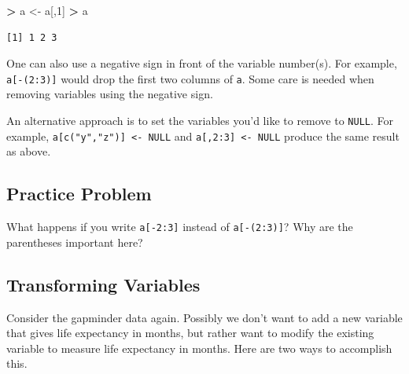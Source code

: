 \documentclass[]{krantz}
\makeatletter
\newenvironment{Shaded}{\begin{snugshade}}{\end{snugshade}}
\newcommand{\KeywordTok}[1]{\textcolor[rgb]{0.27,0.27,0.27}{\textbf{#1}}}
\newcommand{\DecValTok}[1]{\textcolor[rgb]{0.06,0.06,0.06}{#1}}
\newcommand{\StringTok}[1]{\textcolor[rgb]{0.5,0.5,0.5}{#1}}
\newcommand{\OperatorTok}[1]{\textcolor[rgb]{0.43,0.43,0.43}{\textbf{#1}}}
\newcommand{\NormalTok}[1]{#1}
\newenvironment{kframe}{%
\medskip{}
\setlength{\fboxsep}{.8em}
 \def\at@end@of@kframe{}%
 \ifinner\ifhmode%
  \def\at@end@of@kframe{\end{minipage}}%
  \begin{minipage}{\columnwidth}%
 \fi\fi%
 \def\FrameCommand##1{\hskip\@totalleftmargin \hskip-\fboxsep
 \colorbox{shadecolor}{##1}\hskip-\fboxsep
     \hskip-\linewidth \hskip-\@totalleftmargin \hskip\columnwidth}%
 \MakeFramed {\advance\hsize-\width
   \@totalleftmargin\z@ \linewidth\hsize
   \@setminipage}}%
 {\par\unskip\endMakeFramed%
 \at@end@of@kframe}
\renewenvironment{Shaded}{\begin{kframe}}{\end{kframe}}
\makeatother
\begin{document}
\begin{Shaded}
\begin{Highlighting}[]
\OperatorTok{>}\StringTok{ }\NormalTok{a <-}\StringTok{ }\NormalTok{a[,}\DecValTok{1}\NormalTok{]}
\OperatorTok{>}\StringTok{ }\NormalTok{a}
\end{Highlighting}
\end{Shaded}

\begin{verbatim}
[1] 1 2 3
\end{verbatim}

One can also use a negative sign in front of the variable number(s). For
example, \texttt{a{[}-(2:3){]}} would drop the first two columns of
\texttt{a}. Some care is needed when removing variables using the
negative sign.

An alternative approach is to set the variables you'd like to remove to
\texttt{NULL}. For example,
\texttt{a{[}c("y","z"){]}\ \textless{}-\ NULL} and
\texttt{a{[},2:3{]}\ \textless{}-\ NULL} produce the same result as
above.

\subsection{Practice Problem}\label{practice-problem-6}

What happens if you write \texttt{a{[}-2:3{]}} instead of
\texttt{a{[}-(2:3){]}}? Why are the parentheses important here?

\subsection{Transforming Variables}\label{transforming-variables}

Consider the gapminder data again. Possibly we don't want to add a new
variable that gives life expectancy in months, but rather want to modify
the existing variable to measure life expectancy in months. Here are two
ways to accomplish this.

\begin{Shaded}
\end{Shaded}
\end{document}
